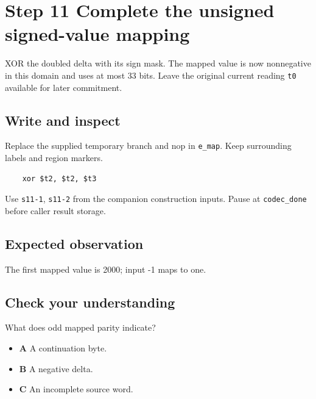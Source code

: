 \section{Step 11 Complete the unsigned signed-value mapping}\label{delta-s11}

XOR the doubled delta with its sign mask. The mapped value is now nonnegative in this domain and uses at most 33 bits. Leave the original current reading \texttt{t0} available for later commitment.

\subsection{Write and inspect}
Replace the supplied temporary branch and nop in \texttt{e\_map}. Keep surrounding labels and region markers.

\begin{verbatim}
    xor $t2, $t2, $t3
\end{verbatim}
Use \texttt{s11-1}, \texttt{s11-2} from the companion construction inputs. Pause at \texttt{codec\_done} before caller result storage.

\subsection{Expected observation}
The first mapped value is 2000; input -1 maps to one.

\subsection{Check your understanding}
What does odd mapped parity indicate?

\begin{itemize}
  \item \textbf{A} A continuation byte.
  \item \textbf{B} A negative delta.
  \item \textbf{C} An incomplete source word.
\end{itemize}
